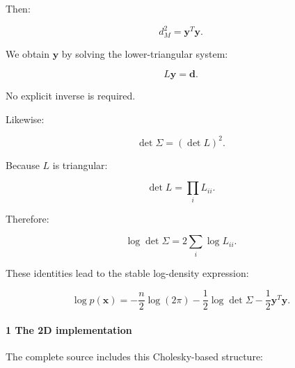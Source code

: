 Then:

\[
 \boxed{d_M^2=\mathbf y^T\mathbf y}.
\]

We obtain \(\mathbf y\) by solving the lower-triangular system:

\[
 L\mathbf y=\mathbf d.
\]

No explicit inverse is required.

Likewise:

\[
 \det\Sigma=(\det L)^2.
\]

Because \(L\) is triangular:

\[
 \det L=\prod_iL_{ii}.
\]

Therefore:

\[
 \boxed{ \log\det\Sigma = 2\sum_i\log L_{ii} }.
\]

These identities lead to the stable log-density expression:

\[
 \boxed{ \log p(\mathbf x)= -\frac n2\log(2\pi) -\frac12\log\det\Sigma -\frac12\mathbf y^T\mathbf y }.
\]

\paragraph{1 The 2D implementation}\label{the-2d-implementation}

The complete source includes this Cholesky-based structure:

